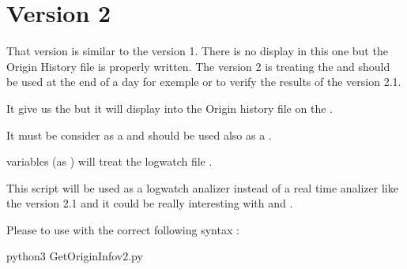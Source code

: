 \documentclass[letterpaper,10pt,english]{sphinxmanual}
\begin{document}
\newpage
\section{Version 2}
\label{\detokenize{Get_Origin_Info:version-2}}
\sphinxAtStartPar
That version is similar to the version 1. There is no display in this one but the Origin History file is properly written.
The version 2 is treating the  and should be used at the end of a day for exemple or to verify the results of the version 2.1.

\sphinxAtStartPar
It give us the  but it will display into the Origin history file  on the .

\sphinxAtStartPar
It must be consider as a  and should be used also as a .

\sphinxAtStartPar
{} variables (as )  will treat the logwatch file .

\sphinxAtStartPar
This script will be used as a logwatch analizer instead of a real time analizer like the version 2.1 and it could be really interesting with  and .

\sphinxAtStartPar
Please to use with the correct following syntax :

\begin{sphinxVerbatim}[commandchars=\\\{\}]
python3 Get\PYGZus{}Origin\PYGZus{}Info\PYGZus{}v2.py
\end{sphinxVerbatim}
\end{document}

